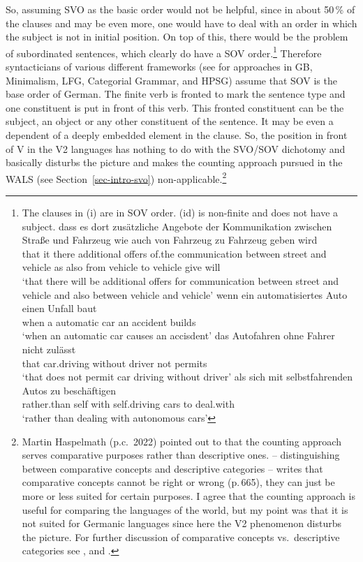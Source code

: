 So, assuming
SVO as the basic order would not be helpful, since in about 50\,\% of the clauses and may be even
more, one would have to deal with an order in which the subject is not in initial position. On top of
this, there would be the problem of subordinated sentences, which clearly do have a SOV
order.\footnote{
The clauses in (i) are in SOV order. (id) is non-finite and does not have a subject.
\eal
\ex 
\gll dass es dort zusätzliche Angebote der Kommunikation zwischen Straße und Fahrzeug wie auch von Fahrzeug zu Fahrzeug geben wird\\
     that it there additional offers   of.the communication between street and vehicle as also from vehicle to vehicle give will\\
\glt `that there will be additional offers for communication between street and vehicle and also
between vehicle and vehicle'
\ex 
\gll wenn ein automatisiertes Auto einen Unfall baut\\
     when a   automatic       car  an accident  builds\\
\glt `when an automatic car causes an accisdent'
\ex 
\gll das Autofahren ohne Fahrer nicht zulässt\\
     that car.driving without driver not permits\\
\glt `that does not permit car driving without driver'
\ex
\gll als sich mit selbstfahrenden Autos zu beschäftigen\\
     rather.than self with self.driving cars to deal.with\\
\glt `rather than dealing with autonomous cars'
\zllast
}
 Therefore syntacticians of various different frameworks (see \citealp{MuellerGT-Eng4} for
approaches in GB, Minimalism, LFG, Categorial Grammar, and HPSG) assume that SOV is the base order of
German. The finite verb is fronted to mark the sentence type and one constituent is put in front of
this verb. This fronted constituent can be the subject, an object or any other constituent of the
sentence. It may be even a dependent of a deeply embedded element in the clause. So, the position
in front of V in the V2 languages has nothing to do with the SVO/SOV dichotomy and basically disturbs
the picture and makes the counting approach pursued in the WALS (see Section~\ref{sec-intro-svo})
non-applicable.\footnote{
  Martin Haspelmath (p.c.\ 2022) pointed out to that the counting approach serves comparative
  purposes rather than descriptive ones. \citet{Haspelmath2010a} -- distinguishing between comparative concepts and descriptive
  categories -- writes that comparative concepts cannot be right or wrong (p.\,665), they can just be more or
  less suited for certain purposes. I agree that the counting approach is useful for comparing the
  languages of the world, but my point was that it is not suited for Germanic languages since here
  the V2 phenomenon disturbs the picture. For further discussion of comparative concepts vs.\ descriptive categories
  see ,  and .
}
